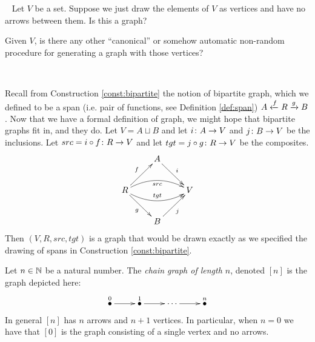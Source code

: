 \documentclass[CT4S-EN-RU]{subfiles}
\begin{document}
\begin{exerciseRUS}
\end{exerciseRUS}

\begin{exerciseENG}~
\sexc Let $V$ be a set. Suppose we just draw the elements of $V$ as vertices and have no arrows between them. Is this a graph?
\item Given $V$, is there any other “canonical” or somehow automatic non-random procedure for generating a graph with those vertices? 
\endsexc
\end{exerciseENG}

\begin{exerciseRUS}~
\end{exerciseRUS}

\begin{exampleENG}
Recall from Construction \ref{const:bipartite} the notion of bipartite graph, which we defined to be a span (i.e. pair of functions, see Definition \ref{def:span}) $A\xleftarrow{f}R\xrightarrow{g}B$. Now that we have a formal definition of graph, we might hope that bipartite graphs fit in, and they do. Let $V=A\sqcup B$ and let $i\colon A\rightarrow V$ and $j\colon B\rightarrow V$ be the inclusions. Let $src=i\circ f\colon R\rightarrow V$ and let $tgt=j\circ g\colon R\rightarrow V$ be the composites.
$$
\xymatrix{&A\ar[dr]^i\\R\ar@/^1pc/[rr]_{src}\ar@/_1pc/[rr]^{tgt}\ar[ur]^f\ar[dr]_g&&V\\&B\ar[ur]_j}
$$ 
Then $(V,R,src,tgt)$ is a graph that would be drawn exactly as we specified the drawing of spans in Construction \ref{const:bipartite}.
\end{exampleENG}

\begin{exampleRUS}
\end{exampleRUS}

\begin{exampleENG}\label{ex:[n] as graph}
Let $n\in{\mathbb N}$ be a natural number. The {\em chain graph of length $n$}, denoted $[n]$ is the graph depicted here:
$$
\xymatrix{
\LMO{0}\ar[r]&\LMO{1}\ar[r]&\cdots\ar[r]&\LMO{n}
}
$$
In general $[n]$ has $n$ arrows and $n+1$ vertices. In particular, when $n=0$ we have that $[0]$ is the graph consisting of a single vertex and no arrows. 
\end{exampleENG}

\begin{exampleRUS}\label{ex:[n] as graph}
\end{exampleRUS}
\end{document}
